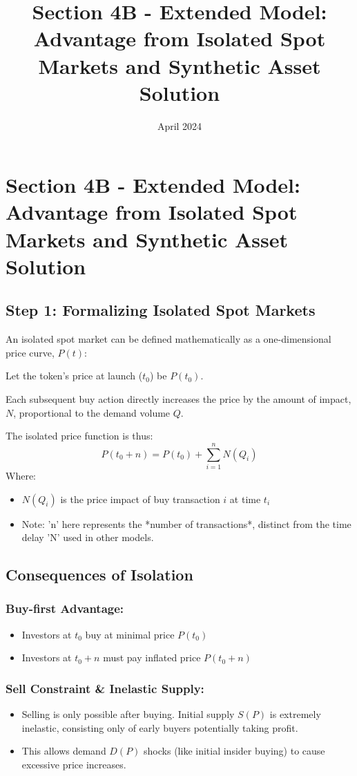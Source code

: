 \documentclass{article}
\title{Section 4B - Extended Model: Advantage from Isolated Spot Markets and Synthetic Asset Solution}
\date{April 2024}
\begin{document}

\section{Section 4B - Extended Model: Advantage from Isolated Spot Markets and Synthetic Asset Solution}
\subsection{Step 1: Formalizing Isolated Spot Markets}

An isolated spot market can be defined mathematically as a one-dimensional price curve, $P(t)$:

Let the token's price at launch ($t_0$) be $P(t_0)$.

Each subsequent buy action directly increases the price by the amount of impact, $N$, proportional to the demand volume $Q$.

The isolated price function is thus:
\[
P(t_0 + n) = P(t_0) + \sum_{i=1}^{n} N(Q_i)
\]
Where:
\begin{itemize}
    \item $N(Q_i)$ is the price impact of buy transaction $i$ at time $t_i$
    \item Note: 'n' here represents the *number of transactions*, distinct from the time delay 'N' used in other models.
\end{itemize}

\subsection*{Consequences of Isolation}

\subsubsection*{Buy-first Advantage:}
\begin{itemize}
    \item Investors at $t_0$ buy at minimal price $P(t_0)$
    \item Investors at $t_0 + n$ must pay inflated price $P(t_0 + n)$
\end{itemize}

\subsubsection*{Sell Constraint & Inelastic Supply:}
\begin{itemize}
    \item Selling is only possible after buying. Initial supply $S(P)$ is extremely inelastic, consisting only of early buyers potentially taking profit.
    \item This allows demand $D(P)$ shocks (like initial insider buying) to cause excessive price increases.
\end{itemize}
\end{document}
